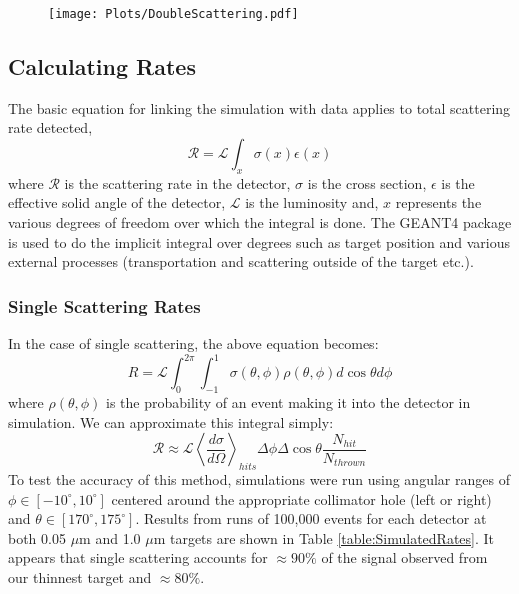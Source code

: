 \documentclass[11pt]{article}
\begin{document}
\begin{figure}[!h]
 \texttt{[image: Plots/DoubleScattering.pdf]}
\end{figure}

\subsection{Calculating Rates}
The basic equation for linking the simulation with data applies to total scattering rate detected,
\begin{equation}
 \mathcal{R} = \mathcal{L} \int_x \sigma(x)\epsilon(x)
\end{equation}
where $\mathcal{R}$ is the scattering rate in the detector, $\sigma$ is the cross section, $\epsilon$ is the effective solid angle of the detector, $\mathcal{L}$ is the luminosity and, $x$ represents the various degrees of freedom over which the integral is done. The GEANT4 package is used to do the implicit integral over degrees such as target position and various external processes (transportation and scattering outside of the target etc.). 

\subsubsection{Single Scattering Rates}
In the case of single scattering, the above equation becomes:
\begin{equation}
 R = \mathcal{L} \int_0^{2\pi}\int_{-1}^1 \sigma(\theta,\phi)\rho (\theta,\phi)d\cos\theta d\phi
\end{equation}
where $\rho(\theta,\phi)$ is the probability of an event making it into the detector in simulation. We can approximate this integral simply:
\begin{equation}
 \mathcal{R} \approx \mathcal{L} \left\langle\frac{d\sigma}{d\Omega}\right\rangle_{hits} \Delta\phi \Delta\cos\theta \frac{N_{hit}}{N_{thrown}}
\end{equation}
To test the accuracy of this method, simulations were run using angular ranges of $\phi \in [-10^\circ,10^\circ]$ centered around the appropriate collimator hole (left or right) and $\theta \in [170^\circ,175^\circ]$. Results from runs of 100,000 events for each detector at both 0.05 $\mu$m and 1.0 $\mu$m targets are shown in Table \ref{table:SimulatedRates}. It appears that single scattering accounts for $\approx 90\%$ of the signal observed from our thinnest target and $\approx 80\%$.
\end{document}
